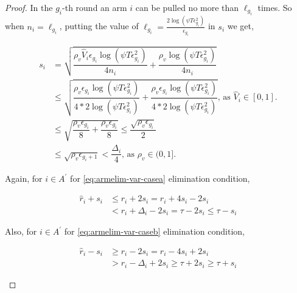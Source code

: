 \begin{proof}
In the $g_{i}$-th round an arm $i$ can be pulled no more than $\ell_{g_{i}}$ times. So when $n_{i}=\ell_{g_{i}}$, putting the value of $\ell_{g_{i}}=\frac{2\log{(\psi T\epsilon_{g_{i}}^{2})}}{\epsilon_{g_{i}}}$ in $s_{i}$ we get, 
\begin{small}
\begin{align*}
s_{i}&=\sqrt{\dfrac{\rho_v \hat{V}_{i} \epsilon_{g_{i}}\log (\psi T\epsilon_{g_{i}}^{2})}{4 n_{i}} + \dfrac{\rho_v \log{(\psi T\epsilon_{g_{i}}^{2})}}{4 n_{i}}} \\
&\leq \sqrt{\dfrac{\rho_v \epsilon_{g_{i}}\log (\psi T\epsilon_{g_{i}}^{2})}{4*2 \log(\psi T\epsilon_{g_{i}}^{2})} + \dfrac{\rho_v \epsilon_{g_{i}} \log{(\psi T\epsilon_{g_{i}}^{2})}}{4*2 \log(\psi T\epsilon_{g_{i}}^{2})} } \text{, as }\hat{V}_{i}\in [0,1].\\
& \leq \sqrt{\dfrac{\rho_v \epsilon_{g_{i}}}{8} + \dfrac{\rho_v \epsilon_{g_{i}}}{8} } \leq \dfrac{\sqrt{\rho_v \epsilon_{g_{i}}}}{2}\\
& \leq \sqrt{\rho_v \epsilon_{g_{i}+1}} < \dfrac{\Delta_{i}}{4} \text{, as }\rho_v\in (0,1].
\end{align*}
\end{small}


Again, for ${i} \in A^{'}$ for \ref{eq:armelim-var-casea} elimination condition,
\begin{small}
\begin{align*}
\hat{r}_{i} + s_{i}&\leq r_{i} + 2s_{i} = r_{i} + 4s_{i} - 2s_{i} \\
&< r_{i} + \Delta_{i} - 2s_{i} = \tau -2s_{i} \leq \tau - s_{i}
\end{align*}
\end{small} 


Also, for ${i} \in A^{'}$ for \ref{eq:armelim-var-caseb} elimination condition, 
\begin{small}
\begin{align*}
\hat{r}_{i} - s_{i}&\geq r_{i} - 2s_{i} = r_{i} - 4s_{i} + 2s_{i} \\
&> r_{i} - \Delta_{i} + 2s_{i}\geq \tau + 2s_{i} \geq \tau + s_{i}
\end{align*}
\end{small}



\end{proof}
